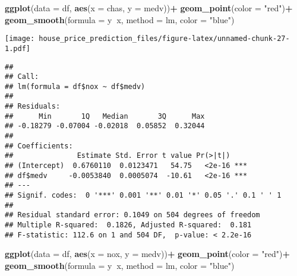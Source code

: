 \documentclass[
]{article}
\newenvironment{Shaded}{\begin{snugshade}}{\end{snugshade}}
\newcommand{\DataTypeTok}[1]{\textcolor[rgb]{0.13,0.29,0.53}{#1}}
\newcommand{\KeywordTok}[1]{\textcolor[rgb]{0.13,0.29,0.53}{\textbf{#1}}}
\newcommand{\NormalTok}[1]{#1}
\newcommand{\OperatorTok}[1]{\textcolor[rgb]{0.81,0.36,0.00}{\textbf{#1}}}
\newcommand{\StringTok}[1]{\textcolor[rgb]{0.31,0.60,0.02}{#1}}
\begin{document}
\begin{Shaded}
\begin{Highlighting}[]
\KeywordTok{ggplot}\NormalTok{(}\DataTypeTok{data =}\NormalTok{ df, }\KeywordTok{aes}\NormalTok{(}\DataTypeTok{x =}\NormalTok{ chas, }\DataTypeTok{y =}\NormalTok{ medv))}\OperatorTok{+}
\StringTok{  }\KeywordTok{geom_point}\NormalTok{(}\DataTypeTok{color =} \StringTok{"red"}\NormalTok{)}\OperatorTok{+}
\StringTok{  }\KeywordTok{geom_smooth}\NormalTok{(}\DataTypeTok{formula =}\NormalTok{ y}\OperatorTok{~}\NormalTok{x, }\DataTypeTok{method =}\NormalTok{ lm, }\DataTypeTok{color =} \StringTok{"blue"}\NormalTok{)}
\end{Highlighting}
\end{Shaded}

\texttt{[image: house\_price\_prediction\_files/figure-latex/unnamed-chunk-27-1.pdf]}

\begin{Shaded}
\end{Shaded}

\begin{verbatim}
## 
## Call:
## lm(formula = df$nox ~ df$medv)
## 
## Residuals:
##      Min       1Q   Median       3Q      Max 
## -0.18279 -0.07004 -0.02018  0.05852  0.32044 
## 
## Coefficients:
##               Estimate Std. Error t value Pr(>|t|)    
## (Intercept)  0.6760110  0.0123471   54.75   <2e-16 ***
## df$medv     -0.0053840  0.0005074  -10.61   <2e-16 ***
## ---
## Signif. codes:  0 '***' 0.001 '**' 0.01 '*' 0.05 '.' 0.1 ' ' 1
## 
## Residual standard error: 0.1049 on 504 degrees of freedom
## Multiple R-squared:  0.1826, Adjusted R-squared:  0.181 
## F-statistic: 112.6 on 1 and 504 DF,  p-value: < 2.2e-16
\end{verbatim}

\begin{Shaded}
\begin{Highlighting}[]
\KeywordTok{ggplot}\NormalTok{(}\DataTypeTok{data =}\NormalTok{ df, }\KeywordTok{aes}\NormalTok{(}\DataTypeTok{x =}\NormalTok{ nox, }\DataTypeTok{y =}\NormalTok{ medv))}\OperatorTok{+}
\StringTok{  }\KeywordTok{geom_point}\NormalTok{(}\DataTypeTok{color =} \StringTok{"red"}\NormalTok{)}\OperatorTok{+}
\StringTok{  }\KeywordTok{geom_smooth}\NormalTok{(}\DataTypeTok{formula =}\NormalTok{ y}\OperatorTok{~}\NormalTok{x, }\DataTypeTok{method =}\NormalTok{ lm, }\DataTypeTok{color =} \StringTok{"blue"}\NormalTok{)}
\end{Highlighting}
\end{Shaded}
\end{document}

